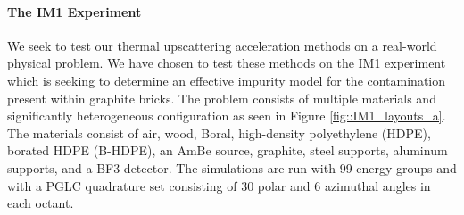 \documentclass[11pt]{article}
\begin{document}
\paragraph{The IM1 Experiment}
\label{sec::CW_DSA_Upscatter_IM1}

We seek to test our thermal upscattering acceleration methods on a real-world physical problem. We have chosen to test these methods on the IM1 experiment which is seeking to determine an effective impurity model for the contamination present within graphite bricks. The problem consists of multiple materials and significantly heterogeneous configuration as seen in Figure \ref{fig::IM1_layouts_a}. The materials consist of air, wood, Boral, high-density polyethylene (HDPE), borated HDPE (B-HDPE), an AmBe source, graphite, steel supports, aluminum supports, and a BF3 detector. The simulations are run with 99 energy groups and with a PGLC quadrature set consisting of 30 polar and 6 azimuthal angles in each octant.
\end{document}
